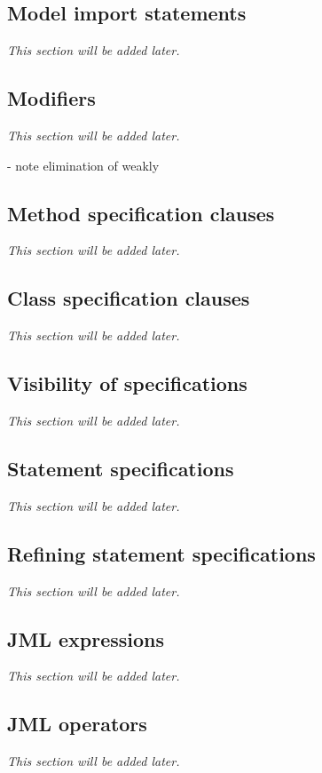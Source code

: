 \documentclass{report}%
\begin{document}
\subsection{Model import statements}
\textit{This section will be added later.} %

\subsection{Modifiers}
\textit{This section will be added later.} %

- note elimination of weakly

\subsection{Method specification clauses}
\textit{This section will be added later.} %

\subsection{Class specification clauses}
\textit{This section will be added later.} %

\subsection{Visibility of specifications}
\textit{This section will be added later.} %

\subsection{Statement specifications}
\textit{This section will be added later.} %

\subsection{Refining statement specifications}
\textit{This section will be added later.} %

\subsection{JML expressions}
\textit{This section will be added later.} %

\subsection{JML operators}
\textit{This section will be added later.} %
\end{document}
